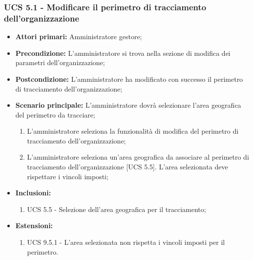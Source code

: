 \subsubsection{UCS 5.1 - Modificare il perimetro di tracciamento dell'organizzazione}%
\begin{itemize}
    \item \textbf{Attori primari:} Amministratore gestore;
    \item \textbf{Precondizione:} L'amministratore si trova nella sezione di modifica dei parametri dell'organizzazione;
    \item \textbf{Postcondizione:} L'amministratore ha modificato con successo il perimetro di tracciamento dell'organizzazione;
    \item \textbf{Scenario principale:} L'amministratore dovrà selezionare l'area geografica del perimetro da tracciare;
    \begin{enumerate}%
        \item L'amministratore seleziona la funzionalità di modifica del perimetro di tracciamento dell'organizzazione;
        \item L'amministratore seleziona un'area geografica da associare al perimetro di tracciamento dell'organizzazione [UCS 5.5]. L'area selezionata deve rispettare i vincoli imposti;
    \end{enumerate}
    \item \textbf{Inclusioni:}
    \begin{enumerate}
        \item UCS 5.5 - Selezione dell'area geografica per il tracciamento;
    \end{enumerate}
    \item \textbf{Estensioni:}
    \begin{enumerate}
        \item UCS 9.5.1 - L'area selezionata non rispetta i vincoli imposti per il perimetro.
    \end{enumerate}
\end{itemize}


